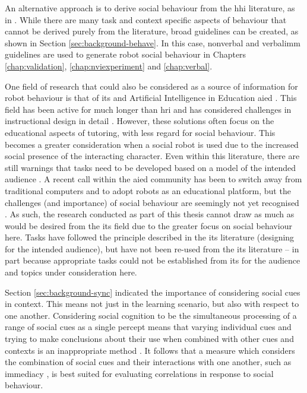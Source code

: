 An alternative approach is to derive social behaviour from the \acrshort{hhi} literature, as in \cite{szafir2012pay}. While there are many task and context specific aspects of behaviour that cannot be derived purely from the literature, broad guidelines can be created, as shown in Section \ref{sec:background-behave}. In this case, nonverbal and \gls{verbalimm} guidelines are used to generate robot social behaviour in Chapters \ref{chap:validation}, \ref{chap:nviexperiment} and \ref{chap:verbal}.

One field of research that could also be considered as a source of information for robot behaviour is that of \acrshort{its} and Artificial Intelligence in Education \acrshort{aied} \citep{freedman2000links}. This field has been active for much longer than \acrshort{hri} and has considered challenges in instructional design in detail \citep{vanlehn2006behavior}. However, these solutions often focus on the educational aspects of tutoring, with less regard for social behaviour. This becomes a greater consideration when a social robot is used due to the increased social presence of the interacting character. Even within this literature, there are still warnings that tasks need to be developed based on a model of the intended audience \citep{murray1999authoring}. A recent call within the \acrshort{aied} community has been to switch away from traditional computers and to adopt robots as an educational platform, but the challenges (and importance) of social behaviour are seemingly not yet recognised \citep{timms2016letting}. As such, the research conducted as part of this thesis cannot draw as much as would be desired from the \acrshort{its} field due to the greater focus on social behaviour here. Tasks have followed the principle described in the \acrshort{its} literature (designing for the intended audience), but have not been re-used from the \acrshort{its} literature -- in part because appropriate tasks could not be established from \acrshort{its} for the audience and topics under consideration here.

Section \ref{sec:background-sync} indicated the importance of considering social cues in context. This means not just in the learning scenario, but also with respect to one another. Considering social cognition to be the simultaneous processing of a range of social cues as a single percept means that varying individual cues and trying to make conclusions about their use when combined with other cues and contexts is an inappropriate method \citep{zaki2013cue}. It follows that a measure which considers the combination of social cues and their interactions with one another, such as \gls{immediacy} \citep{mehrabian1968some}, is best suited for evaluating correlations in response to social behaviour.

